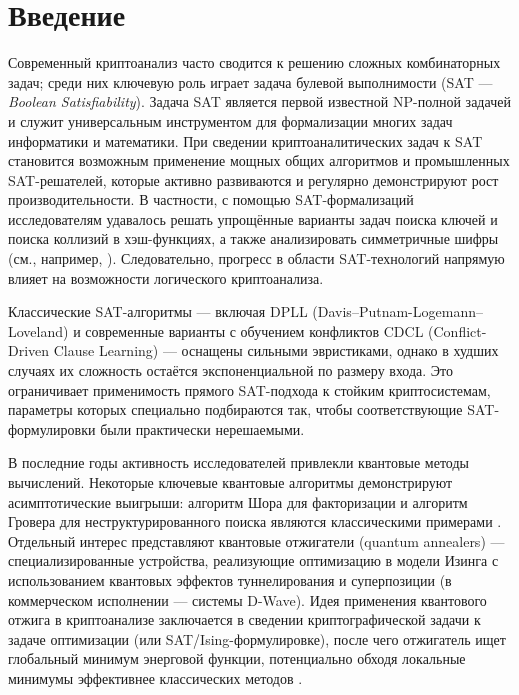 
\section{Введение}

Современный криптоанализ часто сводится к решению сложных комбинаторных задач; среди них ключевую роль играет задача булевой выполнимости (SAT — \emph{Boolean Satisfiability}). Задача SAT является первой известной NP-полной задачей и служит универсальным инструментом для формализации многих задач информатики и математики. При сведении криптоаналитических задач к SAT становится возможным применение мощных общих алгоритмов и промышленных SAT-решателей, которые активно развиваются и регулярно демонстрируют рост производительности. В частности, с помощью SAT-формализаций исследователям удавалось решать упрощённые варианты задач поиска ключей и поиска коллизий в хэш-функциях, а также анализировать симметричные шифры (см., например, \cite{Mironov2006,Lafitte2014,Zhang2000}). Следовательно, прогресс в области SAT-технологий напрямую влияет на возможности логического криптоанализа.

Классические SAT-алгоритмы — включая DPLL (Davis–Putnam-Logemann–Loveland) и современные варианты с обучением конфликтов CDCL (Conflict-Driven Clause Learning) — оснащены сильными эвристиками, однако в худших случаях их сложность остаётся экспоненциальной по размеру входа. Это ограничивает применимость прямого SAT-подхода к стойким криптосистемам, параметры которых специально подбираются так, чтобы соответствующие SAT-формулировки были практически нерешаемыми.

В последние годы активность исследователей привлекли квантовые методы вычислений. Некоторые ключевые квантовые алгоритмы демонстрируют асимптотические выигрыши: алгоритм Шора для факторизации и алгоритм Гровера для неструктурированного поиска являются классическими примерами \cite{Shor1994,Grover1996}. Отдельный интерес представляют квантовые отжигатели (quantum annealers) — специализированные устройства, реализующие оптимизацию в модели Изинга с использованием квантовых эффектов туннелирования и суперпозиции (в коммерческом исполнении — системы D-Wave). Идея применения квантового отжига в криптоанализе заключается в сведении криптографической задачи к задаче оптимизации (или SAT/Ising-формулировке), после чего отжигатель ищет глобальный минимум энерговой функции, потенциально обходя локальные минимумы эффективнее классических методов \cite{Bian2018}.

